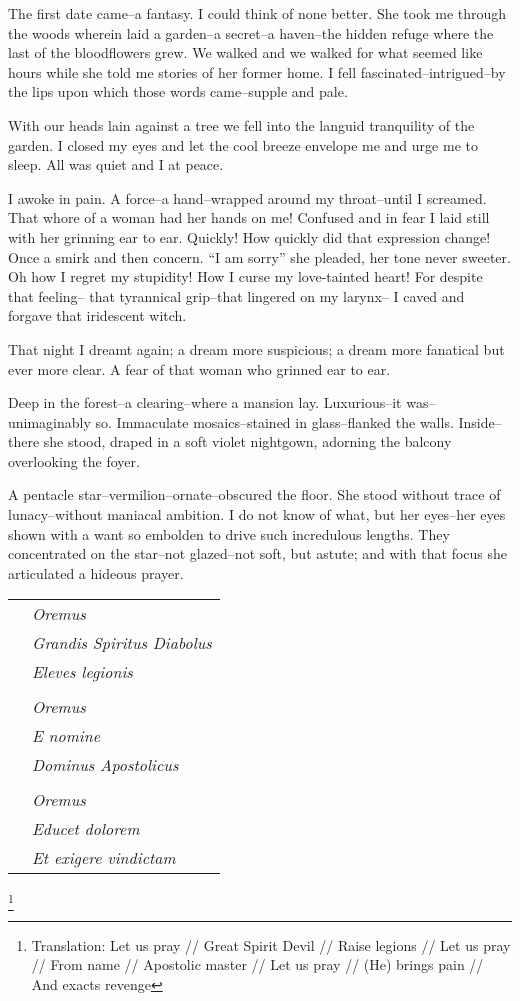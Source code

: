 \documentclass{article}
\begin{document}
\noindent %
The first date came--a fantasy.
I could think of none better. %
She took me through the woods wherein laid a garden--a
secret--a haven--the hidden refuge where
the last of the bloodflowers grew.
We walked and we walked for what seemed like hours
while she told me stories of her former home.
I fell fascinated--intrigued--by the lips
upon which those words came--supple and pale.


With our heads lain against a tree we
fell into the languid tranquility of the garden.
I closed my eyes and let the cool breeze envelope me
and urge me to sleep. All was quiet and I at peace.


I awoke in pain.
A force--a hand--wrapped around my throat--until I screamed.
That whore of a woman had her hands on me!
Confused and in fear I laid still
with her grinning ear to ear.
Quickly! How quickly did that expression change!
Once a smirk and then concern.
``I am sorry'' she pleaded, her tone never sweeter.
Oh how I regret my stupidity!
How I curse my love-tainted heart!
For despite that feeling--
that tyrannical grip--that lingered on my larynx--
I caved and forgave that iridescent witch.


That night I dreamt again; a dream more suspicious;
a dream more fanatical but ever more clear.
A fear of that woman who grinned ear to ear. %
\VV


\noindent
Deep in the forest--a clearing--where a mansion lay.
Luxurious--it was--unimaginably so.
Immaculate mosaics--stained in glass--flanked the walls.
Inside--there she stood, draped in a soft violet nightgown,
adorning the balcony overlooking the foyer.


A pentacle star--vermilion--ornate--obscured the floor.
She stood without trace of lunacy--without
maniacal ambition.
I do not know of what, but her eyes--her eyes
shown with a want so embolden to drive
such incredulous lengths.
They concentrated on the star--not
glazed--not soft, but astute; and with
that focus she articulated a hideous prayer.
\VV


\singlespace
\begin{tabular}{ll}
& \textit{Oremus} \\
& \textit{Grandis Spiritus Diabolus} \\
& \textit{Eleves legionis} \\
& \\
& \textit{Oremus} \\
& \textit{E nomine} \\
& \textit{Dominus Apostolicus} \\
& \\
& \textit{Oremus} \\
& \textit{Educet dolorem} \\
& \textit{Et exigere vindictam} \\
\end{tabular}\revertspace\footnote{
Translation:
Let us pray // Great Spirit Devil // Raise legions //
Let us pray // From name // Apostolic master //
Let us pray // (He) brings pain // And exacts revenge
} \vspace*{3ex}
\end{document}
